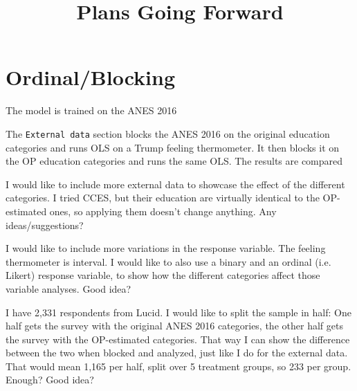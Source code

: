 

\title{Plans Going Forward}

\date{}



\maketitle

\vspace{-1.6cm}

\section*{Ordinal/Blocking}
	\begin{coi}
		\item The model is trained on the ANES 2016
		\item The \texttt{External data} section blocks the ANES 2016 on the original education categories and runs OLS on a Trump feeling thermometer. It then blocks it on the OP education categories and runs the same OLS. The results are compared
		\item I would like to include more external data to showcase the effect of the different categories. I tried CCES, but their education are virtually identical to the OP-estimated ones, so applying them doesn't change anything. Any ideas/suggestions? 
		\item I would like to include more variations in the response variable. The feeling thermometer is interval. I would like to also use a binary and an ordinal (i.e. Likert) response variable, to show how the different categories affect those variable analyses. Good idea?
		\item I have 2,331 respondents from Lucid. I would like to split the sample in half: One half gets the survey with the original ANES 2016 categories, the other half gets the survey with the OP-estimated categories. That way I can show the difference between the two when blocked and analyzed, just like I do for the external data. That would mean 1,165 per half, split over 5 treatment groups, so 233 per group. Enough? Good idea?
	\end{coi}
	
